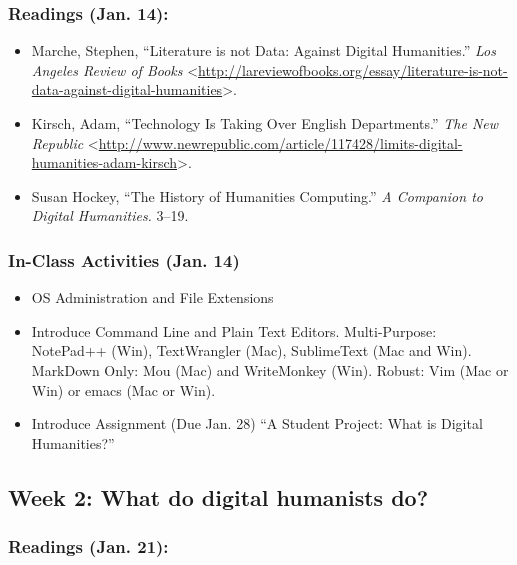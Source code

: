 \documentclass[]{article}
\begin{document}
\subsubsection{Readings (Jan. 14):}\label{readings-jan.-14}

\begin{itemize}
\itemsep1pt\parskip0pt
\item
  Marche, Stephen, ``Literature is not Data: Against Digital
  Humanities.'' \emph{Los Angeles Review of Books}
  \textless{}\url{http://lareviewofbooks.org/essay/literature-is-not-data-against-digital-humanities}\textgreater{}.
\item
  Kirsch, Adam, ``Technology Is Taking Over English Departments.''
  \emph{The New Republic}
  \textless{}\url{http://www.newrepublic.com/article/117428/limits-digital-humanities-adam-kirsch}\textgreater{}.
\item
  Susan Hockey, ``The History of Humanities Computing.'' \emph{A
  Companion to Digital Humanities.} 3--19.
\end{itemize}

\subsubsection{In-Class Activities (Jan.
14)}\label{in-class-activities-jan.-14}

\begin{itemize}
\itemsep1pt\parskip0pt
\item
  OS Administration and File Extensions
\item
  Introduce Command Line and Plain Text Editors. Multi-Purpose:
  NotePad++ (Win), TextWrangler (Mac), SublimeText (Mac and Win).
  MarkDown Only: Mou (Mac) and WriteMonkey (Win). Robust: Vim (Mac or
  Win) or emacs (Mac or Win).
\item
  Introduce Assignment (Due Jan. 28) ``A Student Project: What is
  Digital Humanities?''
\end{itemize}

\subsection{Week 2: What do digital humanists
do?}\label{week-2-what-do-digital-humanists-do}

\subsubsection{Readings (Jan. 21):}\label{readings-jan.-21}
\end{document}

